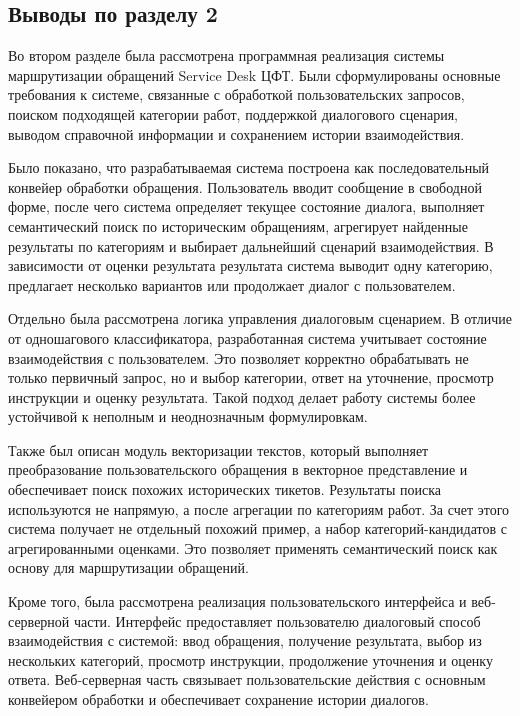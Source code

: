 \documentclass[14pt,a4paper]{extarticle}
\numberwithin{figure}{section}
\numberwithin{table}{section}
\begin{document}
\subsection{Выводы по разделу 2}

Во втором разделе была рассмотрена программная реализация системы
маршрутизации обращений Service Desk ЦФТ. Были сформулированы основные
требования к системе, связанные с обработкой пользовательских запросов,
поиском подходящей категории работ, поддержкой диалогового сценария,
выводом справочной информации и сохранением истории взаимодействия.

Было показано, что разрабатываемая система построена как
последовательный конвейер обработки обращения. Пользователь вводит
сообщение в свободной форме, после чего система определяет текущее
состояние диалога, выполняет семантический поиск по историческим
обращениям, агрегирует найденные результаты по категориям и выбирает
дальнейший сценарий взаимодействия. В зависимости от оценки результата
результата система выводит одну категорию, предлагает несколько
вариантов или продолжает диалог с пользователем.

Отдельно была рассмотрена логика управления диалоговым сценарием. В
отличие от одношагового классификатора, разработанная система учитывает
состояние взаимодействия с пользователем. Это позволяет корректно
обрабатывать не только первичный запрос, но и выбор категории, ответ на
уточнение, просмотр инструкции и оценку результата. Такой подход делает
работу системы более устойчивой к неполным и неоднозначным
формулировкам.

Также был описан модуль векторизации текстов, который выполняет
преобразование пользовательского обращения в векторное представление и обеспечивает
поиск похожих исторических тикетов. Результаты поиска используются не
напрямую, а после агрегации по категориям работ. За счет этого система
получает не отдельный похожий пример, а набор категорий-кандидатов с
агрегированными оценками. Это позволяет применять семантический поиск как
основу для маршрутизации обращений.

Кроме того, была рассмотрена реализация пользовательского интерфейса и
веб-серверной части. Интерфейс предоставляет пользователю диалоговый
способ взаимодействия с системой: ввод обращения, получение результата,
выбор из нескольких категорий, просмотр инструкции, продолжение
уточнения и оценку ответа. Веб-серверная часть связывает
пользовательские действия с основным конвейером обработки и обеспечивает
сохранение истории диалогов.
\end{document}
